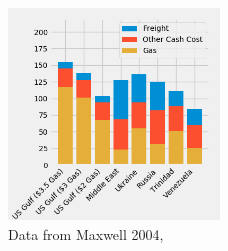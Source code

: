 \begin{figure}
    \centering
    \includegraphics[width=0.5\textwidth]{Figures/Cost_By_location.png}
    \caption{Data from Maxwell 2004\cite{maxwell2004synthetic}, }
    \label{fig:relative_costs}
\end{figure}

%



